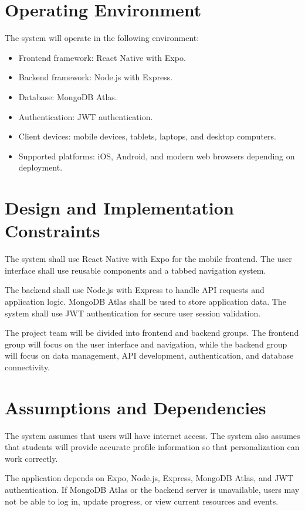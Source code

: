 \documentclass{scrreprt}
\begin{document}
\section{Operating Environment}
The system will operate in the following environment:

\begin{itemize}
    \item Frontend framework: React Native with Expo.
    \item Backend framework: Node.js with Express.
    \item Database: MongoDB Atlas.
    \item Authentication: JWT authentication.
    \item Client devices: mobile devices, tablets, laptops, and desktop computers.
    \item Supported platforms: iOS, Android, and modern web browsers depending on deployment.
\end{itemize}

\section{Design and Implementation Constraints}
The system shall use React Native with Expo for the mobile frontend. The user interface shall use reusable components and a tabbed navigation system.

The backend shall use Node.js with Express to handle API requests and application logic. MongoDB Atlas shall be used to store application data. The system shall use JWT authentication for secure user session validation.

The project team will be divided into frontend and backend groups. The frontend group will focus on the user interface and navigation, while the backend group will focus on data management, API development, authentication, and database connectivity.

\section{Assumptions and Dependencies}
The system assumes that users will have internet access. The system also assumes that students will provide accurate profile information so that personalization can work correctly.

The application depends on Expo, Node.js, Express, MongoDB Atlas, and JWT authentication. If MongoDB Atlas or the backend server is unavailable, users may not be able to log in, update progress, or view current resources and events.
\end{document}
